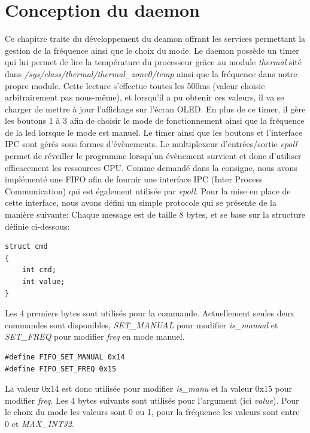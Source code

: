 \documentclass{ReportTemplate}
\begin{document}
\chapter{Conception du daemon}
Ce chapitre traite du développement du deamon offrant les services permettant la
gestion de la fréquence ainsi que le choix du mode.\newline
Le daemon possède un timer qui lui permet de lire la température du processeur
grâce au module \textit{thermal} sité dans
\textit{/sys/class/thermal/thermal\_zone0/temp} ainsi que la fréquence dans notre
propre module. Cette lecture s'effectue toutes les 500ms (valeur choisie
arbitrairement pas nous-même), et lorsqu'il a pu obtenir ces valeurs, il va se
charger de mettre à jour l'affichage sur l'écran OLED. \newline
En plus de ce timer, il gère les boutons 1 à 3 afin de choisir le mode de fonctionnement
ainsi que la fréquence de la led lorsque le mode est manuel.
Le timer ainsi que les boutons et l'interface IPC sont gérés sous formes
d'évènements. Le multiplexeur d'entrées/sortie \textit{epoll} permet
de réveiller le programme lorsqu'un évènement survient et donc d'utiliser
efficacement les ressources CPU. Comme demandé dans la consigne, nous avons
implémenté une FIFO afin de fournir une interface IPC (Inter Process Communication) qui est également utilisée par
\textit{epoll}. Pour la mise en place de cette interface, nous avons défini un
simple protocole qui se présente de la manière suivante:\newline
Chaque message est de taille 8 bytes, et se base sur la structure définie ci-dessous:
\begin{verbatim}
struct cmd
{
    int cmd;
    int value;
}
\end{verbatim}
Les 4 premiers bytes sont utilisés pour la commande.
Actuellement seules deux commandes sont disponibles, \textit{SET\_MANUAL} pour
modifier \textit{is\_manual} et \textit{SET\_FREQ} pour modifier \textit{freq} en
mode manuel.
\begin{verbatim}
#define FIFO_SET_MANUAL 0x14
#define FIFO_SET_FREQ 0x15
\end{verbatim}
La valeur 0x14 est donc utilisée pour modifier \textit{is\_manu} et la valeur
0x15 pour modifier \textit{freq}.\newline
Les 4 bytes suivants sont utilisés pour l'argument (ici \textit{value}). Pour le
choix du mode les valeurs sont 0 ou 1, pour la fréquence les valeurs sont entre
0 et \textit{MAX\_INT32}.\newline
\end{document}
